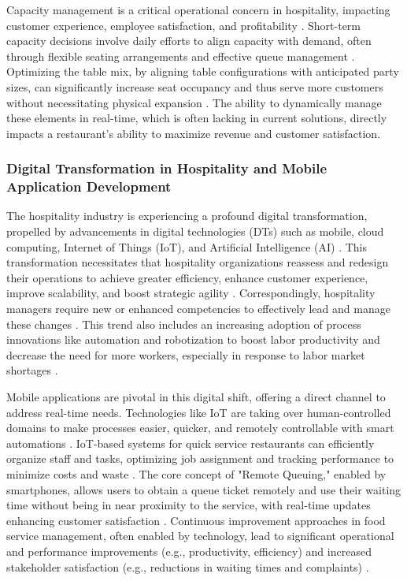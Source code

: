 \documentclass{article}
\begin{document}
Capacity management is a critical operational concern in hospitality, impacting customer experience, employee satisfaction, and profitability \parencite{pullman2010capacity}. Short-term capacity decisions involve daily efforts to align capacity with demand, often through flexible seating arrangements and effective queue management \parencite{pullman2010capacity}. Optimizing the table mix, by aligning table configurations with anticipated party sizes, can significantly increase seat occupancy and thus serve more customers without necessitating physical expansion \parencite{kim2020small}. The ability to dynamically manage these elements in real-time, which is often lacking in current solutions, directly impacts a restaurant's ability to maximize revenue and customer satisfaction.

\subsubsection{Digital Transformation in Hospitality and Mobile Application Development}
The hospitality industry is experiencing a profound digital transformation, propelled by advancements in digital technologies (DTs) such as mobile, cloud computing, Internet of Things (IoT), and Artificial Intelligence (AI) \parencite{busulwa2022digital}. This transformation necessitates that hospitality organizations reassess and redesign their operations to achieve greater efficiency, enhance customer experience, improve scalability, and boost strategic agility \parencite{busulwa2022digital}. Correspondingly, hospitality managers require new or enhanced competencies to effectively lead and manage these changes \parencite{busulwa2022digital}. This trend also includes an increasing adoption of process innovations like automation and robotization to boost labor productivity and decrease the need for more workers, especially in response to labor market shortages \parencite{buurman2024investigating}.

Mobile applications are pivotal in this digital shift, offering a direct channel to address real-time needs. Technologies like IoT are taking over human-controlled domains to make processes easier, quicker, and remotely controllable with smart automations \parencite{aytac2018iot}. IoT-based systems for quick service restaurants can efficiently organize staff and tasks, optimizing job assignment and tracking performance to minimize costs and waste \parencite{aytac2018iot}. The core concept of "Remote Queuing," enabled by smartphones, allows users to obtain a queue ticket remotely and use their waiting time without being in near proximity to the service, with real-time updates enhancing customer satisfaction \parencite{karu2013waiting}. Continuous improvement approaches in food service management, often enabled by technology, lead to significant operational and performance improvements (e.g., productivity, efficiency) and increased stakeholder satisfaction (e.g., reductions in waiting times and complaints) \parencite{monteiro2024comprehensive}.
\end{document}

